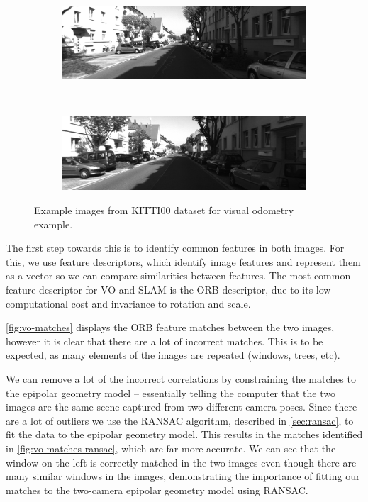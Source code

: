 \begin{figure}[h]
    \centering
    \begin{subfigure}[b]{0.475\textwidth}
        \centering
        \includegraphics[width=\textwidth]{figures/vo_image_8.png}
        \caption{}
        \label{fig:vo-example-image-a}
    \end{subfigure}\hfill%
    ~
    \begin{subfigure}[b]{0.475\textwidth}
        \centering
        \includegraphics[width=\textwidth]{figures/vo_image_9.png}
        \caption{}
        \label{fig:vo-example-image-b}
    \end{subfigure}%
    \caption{Example images from KITTI00 dataset for visual odometry example.}
    \label{fig:vo-example-images}
\end{figure}

The first step towards this is to identify common features in both images. For this, we use feature descriptors, which identify image features and represent them as a vector so we can compare similarities between features. The most common feature descriptor for VO and SLAM is the ORB descriptor, due to its low computational cost and invariance to rotation and scale.

\autoref{fig:vo-matches} displays the ORB feature matches between the two images, however it is clear that there are a lot of incorrect matches. This is to be expected, as many elements of the images are repeated (windows, trees, etc).

We can remove a lot of the incorrect correlations by constraining the matches to the epipolar geometry model – essentially telling the computer that the two images are the same scene captured from two different camera poses. Since there are a lot of outliers we use the RANSAC algorithm, described in \autoref{sec:ransac}, to fit the data to the epipolar geometry model. This results in the matches identified in \autoref{fig:vo-matches-ransac}, which are far more accurate. We can see that the window on the left is correctly matched in the two images even though there are many similar windows in the images, demonstrating the importance of fitting our matches to the two-camera epipolar geometry model using RANSAC.

